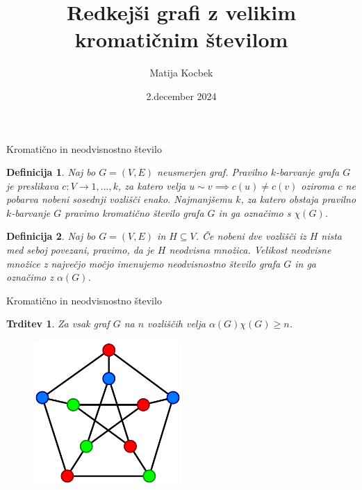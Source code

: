 \documentclass[t]{beamer} %
\title{Redkejši grafi z velikim kromatičnim številom}
\author{Matija Kocbek}
\institute{mentor: prof.~dr.~Riste Škrekovski}
\date{2.\;december 2024}
\newtheorem{definicija}{Definicija}
\newtheorem{trditev}{Trditev}
\newcommand{\fillblack}[1]{
\begin{tikzpicture}[remember picture, overlay]
    \node [shift={(0 cm,0cm)}]  at (current page.south west)
        {%
        \begin{tikzpicture}[remember picture, overlay] at (current page.south west)
            \draw [fill=black] (0, 0) -- (0,#1 \paperheight) --
                              (\paperwidth,#1 \paperheight) -- (\paperwidth,0) -- cycle ;
        \end{tikzpicture}
        };
        \draw (current page.north west) rectangle (current page.south east);
\end{tikzpicture}
}
\begin{document}
\begin{frame}
  \maketitle
\end{frame}

\begin{frame}[fragile]{Kromatično in neodvisnostno število}
  \begin{definicija}
    Naj bo $G = (V, E)$ neusmerjen graf. Pravilno $k$-barvanje grafa $G$ je preslikava $c: V \to {1, \ldots, k}$, za katero velja $u \sim v \implies c(u) \neq c(v)$
    oziroma $c$ ne pobarva nobeni sosednji vozlišči enako. Najmanjšemu $k$, za katero obstaja pravilno $k$-barvanje $G$ pravimo kromatično število grafa $G$ in ga
    označimo s $\chi(G)$.
  \end{definicija}
  \pause
  \begin{definicija}
    Naj bo $G = (V, E)$ in $H \subseteq V$. Če nobeni dve vozlišči iz $H$ nista med seboj povezani, pravimo, da je $H$ neodvisna množica. Velikost neodvisne množice
    z največjo močjo imenujemo neodvisnostno število grafa $G$ in ga označimo z $\alpha(G)$.
  \end{definicija}
\end{frame}

\begin{frame}{Kromatično in neodvisnostno število}
  \begin{trditev}
    Za vsak graf $G$ na $n$ vozliščih velja $\alpha(G)\chi(G) \geq n$.
  \end{trditev}
  \begin{figure}
    \centering
    \includegraphics[width=0.5\textwidth]{Petersen_graph_3-coloring.svg.png}
  \end{figure}
\end{frame}
\end{document}
